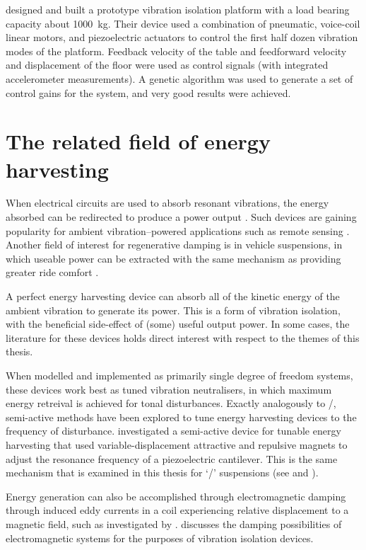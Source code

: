 \textcite{yoshioka2001} designed and built a prototype vibration isolation
platform with a load bearing capacity about \SI{1000}{kg}. Their device used a
combination of pneumatic, voice-coil linear motors, and piezoelectric
actuators to control the first half dozen vibration modes of the platform.
Feedback velocity of the table and feedforward velocity and displacement of
the floor were used as control signals (with integrated accelerometer
measurements). A genetic algorithm was used to generate a set of control gains
for the system, and very good results were achieved.



\section{The related field of energy harvesting}

When electrical circuits are used to absorb resonant vibrations, the energy
absorbed can be redirected to produce a power output \cite{stephen2006}. Such
devices are gaining popularity for ambient vibration--powered applications
such as remote sensing \cite{arnold2007}. Another field of interest for
regenerative damping is in vehicle suspensions, in which useable power can be
extracted with the same mechanism as providing greater ride comfort
\cite{graves2000thesis}.

A perfect energy harvesting device can absorb all of the kinetic energy of the
ambient vibration to generate its power. This is a form of vibration
isolation, with the beneficial side-effect of (some) useful output power. In
some cases, the literature for these devices holds direct interest with
respect to the themes of this thesis.

When modelled and implemented as primarily single degree of freedom systems, these devices work best as tuned vibration neutralisers, in which maximum energy retreival is achieved for tonal disturbances.
Exactly analogously to \vibneut/, semi-active methods have been explored to tune energy harvesting devices to the frequency of disturbance. 
\textcite{challa2008} investigated a semi-active device for tunable energy harvesting that used variable-displacement attractive and repulsive magnets to adjust the resonance frequency of a piezoelectric cantilever.
This is the same mechanism that is examined in this thesis for `\qzs/' suspensions (see  and ).

Energy generation can also be accomplished through electromagnetic damping
through induced eddy currents in a coil experiencing relative displacement to
a magnetic field, such as investigated by \textcite{graves2000}.
 discusses the damping possibilities of electromagnetic
systems for the purposes of vibration isolation devices.


